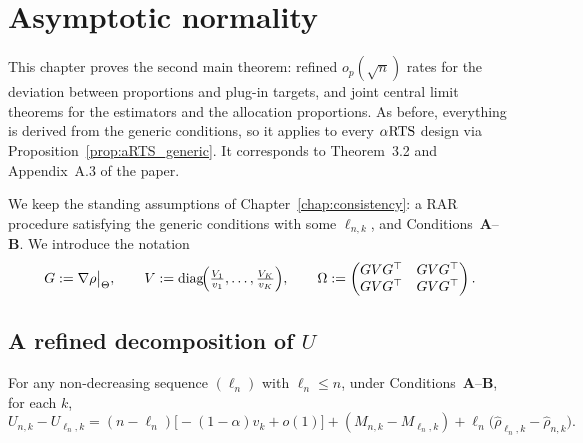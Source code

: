 \chapter{Asymptotic normality}
\label{chap:normality}

This chapter proves the second main theorem: refined $o_p(\sqrt n)$ rates for the
deviation between proportions and plug-in targets, and joint central limit
theorems for the estimators and the allocation proportions. As before, everything
is derived from the generic conditions, so it applies to every $\alpha\text{RTS}$ design via
Proposition~\ref{prop:aRTS_generic}. It corresponds to Theorem~3.2 and
Appendix~A.3 of the paper.

We keep the standing assumptions of Chapter~\ref{chap:consistency}: a RAR
procedure satisfying the generic conditions with some $\ell_{n,k}$, and
Conditions~\textbf{A}--\textbf{B}. We introduce the notation
\[
  G := \nabla\rho\big|_\Theta, \qquad
  V := \mathrm{diag}\!\Big(\tfrac{V_1}{v_1}, \dots, \tfrac{V_K}{v_K}\Big), \qquad
  \Omega := \begin{pmatrix} GVG^\top & GVG^\top\\ GVG^\top & GVG^\top\end{pmatrix}.
\]

\section{A refined decomposition of \texorpdfstring{$U$}{U}}
\label{sec:norm_U}

\begin{lemma}\label{lem:diff_U_decomp}
\leanok
{}
For any non-decreasing sequence $(\ell_n)$ with $\ell_n\le n$, under
Conditions~\textbf{A}--\textbf{B}, for each $k$,
\[
  U_{n,k} - U_{\ell_n,k}
  = (n-\ell_n)\big[-(1-\alpha)v_k + o(1)\big]
    + (M_{n,k} - M_{\ell_n,k})
    + \ell_n\big(\hat{\rho}_{\ell_n,k} - \hat{\rho}_{n,k}\big).
\]
\end{lemma}

